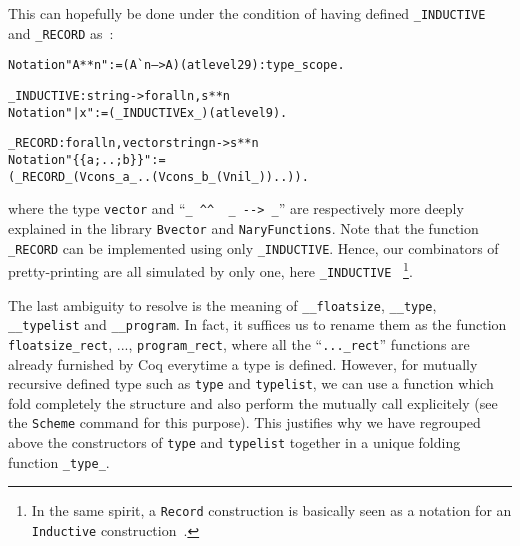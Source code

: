\documentclass[a4paper, 11pt]{article}
\newenvironment{coq}
  {%
   \begin{alltt}} %% 8.3pl1 (January 2011)
  {\end{alltt} %
  }
\begin{document}
This can hopefully be done under the condition of having defined \verb|_INDUCTIVE| and \verb|_RECORD| as~:
\begin{coq}
  Notation "A ** n" := (A ^^ n --> A) (at level 29) : type_scope.

_INDUCTIVE : string -> forall n, s ** n
  Notation "| x" := (_INDUCTIVE x _) (at level 9).

_RECORD : forall n, vector string n -> s ** n
  Notation "\{\{ a ; .. ; b \}\}" := 
    (_RECORD _ (Vcons _ a _ .. (Vcons _ b _ (Vnil _)) ..)).
\end{coq}
where the type \verb|vector| and ``\verb|_ ^^  _ --> _|'' are respectively more deeply explained in the library \verb|Bvector| and \verb|NaryFunctions|.
Note that the function \verb|_RECORD| can be implemented using only \verb|_INDUCTIVE|. Hence, our combinators of pretty-printing are all simulated by only one, here \verb|_INDUCTIVE|~
\footnote{In the same spirit, a {\tt Record} construction is basically seen as a notation for an {\tt Inductive} construction~\cite{Coq:manual}. %
}.

The last ambiguity to resolve is the meaning of \verb|__floatsize|, \verb|__type|, \verb|__typelist| and \verb|__program|. In fact, it suffices us to rename them as the function \verb|floatsize_rect|, ..., \verb|program_rect|, where all the ``\verb|..._rect|'' functions are already furnished by Coq everytime a type is defined. However, for mutually recursive defined type such as \verb|type| and \verb|typelist|, we can use a function which fold completely the structure and also perform the mutually call explicitely (see the \verb|Scheme| command for this purpose). This justifies why we have regrouped above the constructors of \verb|type| and \verb|typelist| together in a unique folding function \verb|_type_|.
\end{document}
